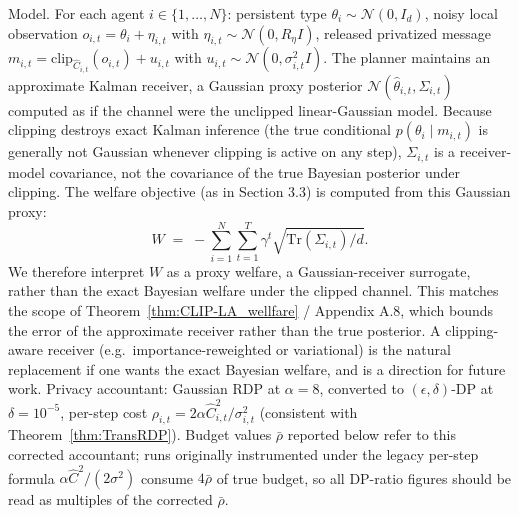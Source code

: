 \documentclass{article}
\begin{document}
Model. For each agent $i \in \{1, \ldots, N\}$: persistent type $\theta_i \sim \mathcal{N}(0, I_d)$, noisy local observation $o_{i,t} = \theta_i + \eta_{i,t}$ with $\eta_{i,t} \sim \mathcal{N}(0, R_\eta I)$, released privatized message $m_{i,t} = \mathrm{clip}_{\hat C_{i,t}}(o_{i,t}) + u_{i,t}$ with $u_{i,t} \sim \mathcal{N}(0, \sigma_{i,t}^2 I)$. The planner maintains an approximate Kalman receiver, a Gaussian proxy posterior $\mathcal{N}(\hat\theta_{i,t}, \Sigma_{i,t})$ computed as if the channel were the unclipped linear-Gaussian model. Because clipping destroys exact Kalman inference (the true conditional $p(\theta_i \mid m_{i,t})$ is generally not Gaussian whenever clipping is active on any step), $\Sigma_{i,t}$ is a receiver-model covariance, not the covariance of the true Bayesian posterior under clipping. The welfare objective (as in Section 3.3) is computed from this Gaussian proxy:
$$W \;=\; -\sum_{i=1}^N \sum_{t=1}^T \gamma^t \sqrt{\mathrm{Tr}(\Sigma_{i,t})/d}.$$
We therefore interpret $W$ as a proxy welfare, a Gaussian-receiver surrogate, rather than the exact Bayesian welfare under the clipped channel. This matches the scope of Theorem~\ref{thm:CLIP-LA_wellfare} / Appendix A.8, which bounds the error of the approximate receiver rather than the true posterior. A clipping-aware receiver (e.g.\ importance-reweighted or variational) is the natural replacement if one wants the exact Bayesian welfare, and is a direction for future work.
Privacy accountant: Gaussian RDP at $\alpha = 8$, converted to $(\epsilon,\delta)$-DP at $\delta=10^{-5}$, per-step cost $\rho_{i,t} = 2\alpha\hat C_{i,t}^2/\sigma_{i,t}^2$ (consistent with Theorem~\ref{thm:TransRDP}). Budget values $\bar\rho$ reported below refer to this corrected accountant; runs originally instrumented under the legacy per-step formula $\alpha\hat C^2/(2\sigma^2)$ consume $4\bar\rho$ of true budget, so all DP-ratio figures should be read as multiples of the corrected $\bar\rho$.
\end{document}

